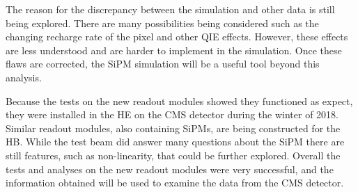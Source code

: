 The reason for the discrepancy between the simulation and other data is still being explored. There are many possibilities being considered such as the changing recharge rate of the pixel and other QIE effects. However, these effects are less understood and are harder to implement in the simulation. Once these flaws are corrected, the SiPM simulation will be a useful tool beyond this analysis. 

Because the tests on the new readout modules showed they functioned as expect, they were installed in the HE on the CMS detector during the winter of 2018. Similar readout modules, also containing SiPMs, are being constructed for the HB. While the test beam did answer many questions about the SiPM there are still features, such as non-linearity, that could be further explored. Overall the tests and analyses on the new readout modules were very successful, and the information obtained will be used to examine the data from the CMS detector.

